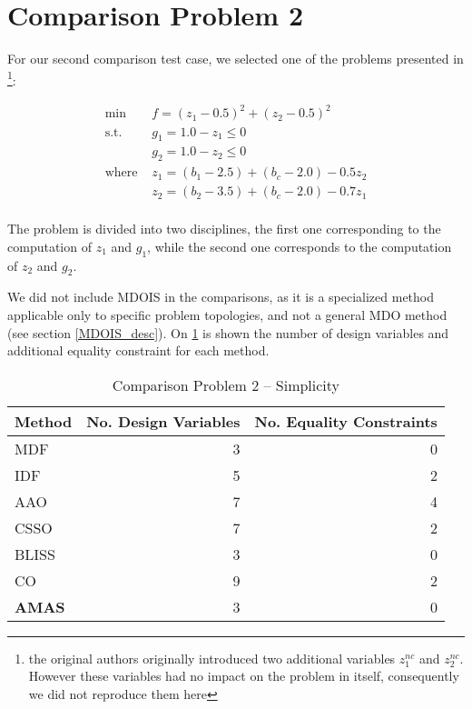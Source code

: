 \section{Comparison Problem 2}

For our second comparison test case, we selected one of the problems presented in  \cite{Yi2008}\footnote{the original authors originally introduced two additional variables $z_1^{nc}$ and $z_2^{nc}$. However these variables had no impact on the problem in itself, consequently we did not reproduce them here}:

\begin{align*}
\text{min }		&	f =(z_1 - 0.5)^2  + (z_2 - 0.5)^2\\
\text{s.t. }			&	g_1 = 1.0 -  z_1 \leq 0\\ 
							&	g_2 = 1.0 -  z_2 \leq 0\\ 
\text{where }	& z_1 = (b_1 - 2.5) + (b_c -2.0) -0.5z_2\\
							& z_2 = (b_2 - 3.5) + (b_c -2.0) -0.7z_1\\
\end{align*}

The problem is divided into two disciplines, the first one corresponding to the computation of $z_1$ and $g_1$, while the second one corresponds to the computation of $z_2$ and $g_2$.

We did not include MDOIS in the comparisons, as it is a specialized method applicable only to specific problem topologies, and not a general MDO method (see section \ref{MDOIS_desc}). On \tablename{} \ref{bench2_simplicity} is shown the number of design variables and additional equality constraint for each method.

\begin{table}
\caption{Comparison Problem 2 -- Simplicity}\label{bench2_simplicity}
\centering
\begin{tabular}{lrr}
\toprule
Method & No. Design Variables & No. Equality Constraints\\
\midrule
MDF					&	3	&	0 \\
IDF						&	5	&	2 \\
AAO					& 7	&	4 \\
CSSO					&	7	&	2 \\
BLISS					&	3	&	0	\\
CO						&	9	&	2	\\
\textbf{AMAS}&	3	&	0	\\
\bottomrule
\end{tabular}
\end{table}

